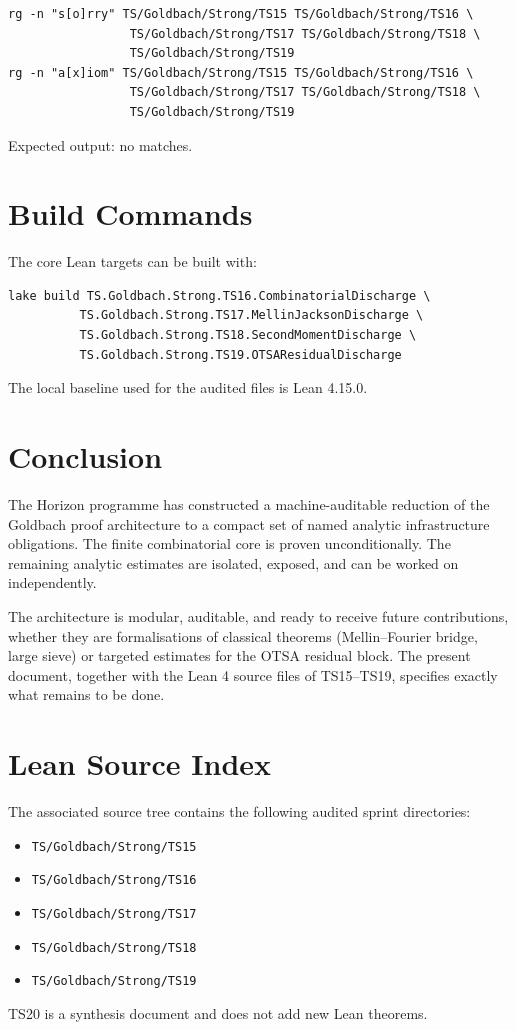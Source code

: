 \documentclass[11pt]{article}
\newcommand{\code}[1]{\texttt{#1}}
\begin{document}
\begin{lstlisting}[language={}]
rg -n "s[o]rry" TS/Goldbach/Strong/TS15 TS/Goldbach/Strong/TS16 \
                 TS/Goldbach/Strong/TS17 TS/Goldbach/Strong/TS18 \
                 TS/Goldbach/Strong/TS19
rg -n "a[x]iom" TS/Goldbach/Strong/TS15 TS/Goldbach/Strong/TS16 \
                 TS/Goldbach/Strong/TS17 TS/Goldbach/Strong/TS18 \
                 TS/Goldbach/Strong/TS19
\end{lstlisting}

Expected output: no matches.

\section{Build Commands}

The core Lean targets can be built with:

\begin{lstlisting}[language={}]
lake build TS.Goldbach.Strong.TS16.CombinatorialDischarge \
          TS.Goldbach.Strong.TS17.MellinJacksonDischarge \
          TS.Goldbach.Strong.TS18.SecondMomentDischarge \
          TS.Goldbach.Strong.TS19.OTSAResidualDischarge
\end{lstlisting}

The local baseline used for the audited files is Lean 4.15.0.

\section{Conclusion}

The Horizon programme has constructed a machine-auditable reduction of the
Goldbach proof architecture to a compact set of named analytic infrastructure
obligations. The finite combinatorial core is proven unconditionally. The
remaining analytic estimates are isolated, exposed, and can be worked on
independently.

The architecture is modular, auditable, and ready to receive future
contributions, whether they are formalisations of classical theorems
(Mellin--Fourier bridge, large sieve) or targeted estimates for the OTSA
residual block. The present document, together with the Lean 4 source files of
TS15--TS19, specifies exactly what remains to be done.

\appendix

\section{Lean Source Index}

The associated source tree contains the following audited sprint directories:

\begin{itemize}
  \item \code{TS/Goldbach/Strong/TS15}
  \item \code{TS/Goldbach/Strong/TS16}
  \item \code{TS/Goldbach/Strong/TS17}
  \item \code{TS/Goldbach/Strong/TS18}
  \item \code{TS/Goldbach/Strong/TS19}
\end{itemize}

TS20 is a synthesis document and does not add new Lean theorems.
\end{document}
